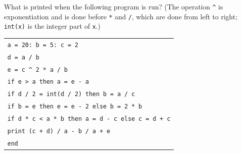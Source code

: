What is printed when the following program is run? (The operation \texttt{\textasciicircum} is exponentiation and is done before \texttt{*} and \texttt{/}, which are done from left to right; \texttt{int(x)} is the integer part of \texttt{x}.)
\begin{center}
\begin{tabular}{l}
\texttt{a = 20: b = 5: c = 2}\\
\texttt{d = a / b}\\
\texttt{e = c \textasciicircum{} 2 * a / b}\\
\texttt{if e > a then a = e - a}\\
\texttt{if d / 2 = int(d / 2) then b = a / c}\\
\texttt{if b = e then e = e - 2 else b = 2 * b}\\
\texttt{if d * c < a * b then a = d - c else c = d + c}\\
\texttt{print (c + d) / a - b / a + e}\\
\texttt{end}
\end{tabular}
\end{center}
